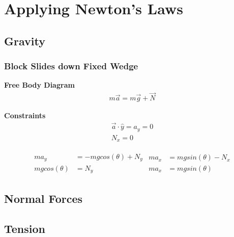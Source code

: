 \documentclass{notes}
\begin{document}
\section{Applying Newton's Laws}
\subsection{Gravity}
\subsubsection*{Block Slides down Fixed Wedge}
\textbf{Free Body Diagram}
\begin{gather*}
    m\vec{a} = m\vec{g}+\vec{N}
\end{gather*}

\textbf{Constraints}
\begin{gather*}
    \vec{a}\cdot \hat{y}=a_y=0\\
    N_x = 0
\end{gather*}

\begin{align*}
    \begin{split}
        ma_y &= -mg cos(\theta) + N_y \\
        mg cos(\theta) &= N_y
    \end{split}
    \begin{split}
        ma_x &= mgsin(\theta)-N_x\\
        ma_x &= mgsin(\theta)
    \end{split}
\end{align*}

\subsection{Normal Forces}


\subsection{Tension}
\end{document}
